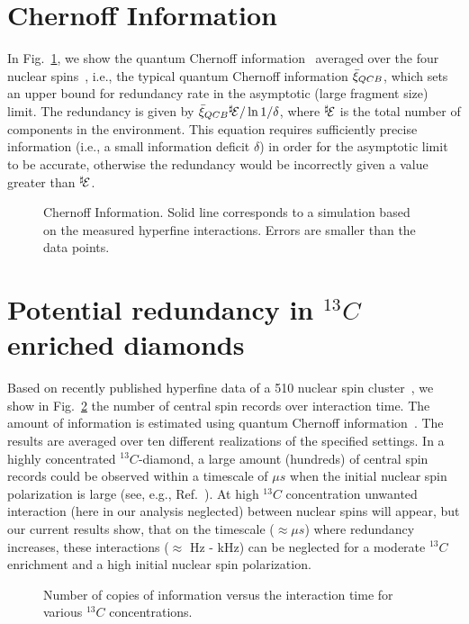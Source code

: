\documentclass[aps,prl,floatfix,twocolumn,footinbib,superscriptaddress]{revtex4-1}
\begin{document}
\section{Chernoff Information}

In Fig.~\ref{fig:S5}, we show the quantum Chernoff information~\cite{Audenaert07} averaged over the four nuclear spins~\cite{Zwolak14,zwolak16}, i.e., the typical quantum Chernoff information $\bar{\xi}_{QCB}$, which sets an upper bound for redundancy rate in the asymptotic (large fragment size) limit. The redundancy is given by $\bar{\xi}_{QCB} {^{\sharp}}\hspace{-0.5mm}\mathcal{E} / \ln 1/\delta$, where ${^{\sharp}}\hspace{-0.5mm}\mathcal{E}$ is the total number of components in the environment. This equation requires sufficiently precise information (i.e., a small information deficit $\delta$) in order for the asymptotic limit to be accurate, otherwise the redundancy would be incorrectly given a value greater than ${^{\sharp}}\hspace{-0.5mm}\mathcal{E}$. 

\begin{figure}
\centerline{}
\caption{Chernoff Information. Solid line corresponds to a simulation based on the measured hyperfine interactions. Errors are smaller than the data points.}
\label{fig:S5}
\end{figure}

\section{Potential redundancy in $^{13}C$ enriched diamonds}

Based on recently published hyperfine data of a 510 nuclear spin cluster~\cite{Nizovtsev18}, we show in Fig.~\ref{fig:S6} the number of central spin records over interaction time. The amount of information is estimated using quantum Chernoff information~\cite{Zwolak14,zwolak16}. The results are averaged over ten different realizations of the specified settings. In a highly concentrated $^{13}C$-diamond, a large amount (hundreds) of central spin records could be observed within a timescale of $\mu s$ when the initial nuclear spin polarization is large (see, e.g., Ref.~\cite{Parker18}). At  high $^{13}C$ concentration unwanted  interaction (here in our analysis neglected) between nuclear spins will appear, but our current results show, that on the timescale ($\approx \mu s$) where redundancy increases, these interactions ($\approx$ Hz - kHz) can be neglected for a moderate $^{13}C$ enrichment and a high initial nuclear spin polarization.

\begin{figure}
\centerline{}
\caption{Number of copies of information versus the interaction time for various $^{13}C$ concentrations.}
\label{fig:S6}
\end{figure}




\end{document}

